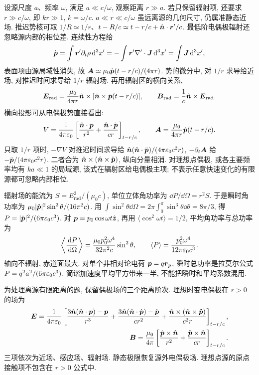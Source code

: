 \label{ch:radiation}
设源尺度 $a$、频率 $\omega$, 满足 $a\ll c/\omega$, 观察距离 $r\gg a$. 若只保留辐射项, 还要求 $r\gg c/\omega$, 即 $kr\gg1$, $k=\omega/c$. $a\ll r\ll c/\omega$ 虽远离源的几何尺寸, 仍属准静态近场. 推迟势核可取 $1/R\simeq1/r$、$t-R/c\simeq t-r/c+\hat{\boldsymbol{n}}\cdot\boldsymbol{r}'/c$. 最低阶电偶极辐射还忽略源内部的相位差. 连续性方程给
\[
\dot{\boldsymbol{p}}=\int\boldsymbol{r}'\partial_t\rho\,\mathrm d^3x'
=-\int\boldsymbol{r}'\nabla'\cdot\boldsymbol{J}\,\mathrm d^3x'=\int\boldsymbol{J}\,\mathrm d^3x',
\]
表面项由源局域性消失, 故 $\boldsymbol{A}\simeq\mu_0\dot{\boldsymbol{p}}(t-r/c)/(4\pi r)$. 势的微分中, 对 $1/r$ 求导给近场, 对推迟时间求导给 $1/r$ 辐射场. 再用辐射区的横向关系,
\[
\boldsymbol{E}_\mathrm{rad}=\frac{\mu_0}{4\pi r}\hat{\boldsymbol{n}}\times[\hat{\boldsymbol{n}}\times\ddot{\boldsymbol{p}}(t-r/c)],\qquad
\boldsymbol{B}_\mathrm{rad}=\frac1c\hat{\boldsymbol{n}}\times\boldsymbol{E}_\mathrm{rad}.
\]
横向投影可从电偶极势直接看出:
\[
V={1\over4\pi\varepsilon_0}\left[\frac{\hat{\boldsymbol{n}}\cdot\boldsymbol{p}}{r^2}+\frac{\hat{\boldsymbol{n}}\cdot\dot{\boldsymbol{p}}}{cr}\right]_{t-r/c},\qquad
\boldsymbol{A}={\mu_0\over4\pi r}\dot{\boldsymbol{p}}(t-r/c).
\]
只取 $1/r$ 项时, $-\nabla V$ 对推迟时间求导给 $\hat{\boldsymbol{n}}(\hat{\boldsymbol{n}}\cdot\ddot{\boldsymbol{p}})/(4\pi\varepsilon_0 c^2r)$, $-\partial_t\boldsymbol{A}$ 给 $-\ddot{\boldsymbol{p}}/(4\pi\varepsilon_0 c^2r)$. 二者合为 $\hat{\boldsymbol{n}}\times(\hat{\boldsymbol{n}}\times\ddot{\boldsymbol{p}})$, 纵向分量相消. 对理想点偶极, 或各主要频率均有 $ka\ll1$ 的局域源, 该式在辐射区给电偶极主项; 不表示任意快速变化的有限源都可忽略内部相位.

辐射场的能流为 $S=E_\mathrm{rad}^2/(\mu_0c)$, 单位立体角功率为 $\dd P/\dd\Omega=r^2S$. 于是瞬时角功率为 $\mu_0|\ddot{\boldsymbol{p}}|^2\sin^2\theta/(16\pi^2c)$. 用
$\int\sin^2\theta\dd\Omega=2\pi\int_0^\pi\sin^3\theta\dd\theta=8\pi/3$, 得 $P=|\ddot{\boldsymbol{p}}|^2/(6\pi\varepsilon_0 c^3)$. 对 $\boldsymbol{p}=p_0\cos\omega t\hat{\boldsymbol{z}}$, 再用 $\langle\cos^2\omega t\rangle=1/2$, 平均角功率与总功率为
\[
\left\langle\frac{\,\mathrm d P}{\,\mathrm d\Omega}\right\rangle
=\frac{\mu_0p_0^2\omega^4}{32\pi^2c}\sin^2\theta,\qquad
\langle P\rangle=\frac{p_0^2\omega^4}{12\pi\varepsilon_0 c^3}.
\]
轴向不辐射, 赤道面最大. 对单个非相对论电荷 $\boldsymbol{p}=q\boldsymbol{r}_p$, 瞬时总功率是拉莫尔公式 $P=q^2a^2/(6\pi\varepsilon_0 c^3)$. 简谐加速度平均平方带来一半, 不能把瞬时和平均系数混用.

为处理离源有限距离的题, 保留偶极场的三个距离阶次. 理想时变电偶极在 $r>0$ 的场为
\begin{align*}
\boldsymbol{E}={1\over4\pi\varepsilon_0}\left[
\frac{3\hat{\boldsymbol{n}}(\hat{\boldsymbol{n}}\cdot\boldsymbol{p})-\boldsymbol{p}}{r^3}
+\frac{3\hat{\boldsymbol{n}}(\hat{\boldsymbol{n}}\cdot\dot{\boldsymbol{p}})-\dot{\boldsymbol{p}}}{cr^2}
+\frac{\hat{\boldsymbol{n}}\times(\hat{\boldsymbol{n}}\times\ddot{\boldsymbol{p}})}{c^2r}\right]_{t-r/c},\\
\boldsymbol{B}={\mu_0\over4\pi}\left[\frac{\dot{\boldsymbol{p}}\times\hat{\boldsymbol{n}}}{r^2}
+\frac{\ddot{\boldsymbol{p}}\times\hat{\boldsymbol{n}}}{cr}\right]_{t-r/c}.
\end{align*}
三项依次为近场、感应场、辐射场. 静态极限恢复源外电偶极场. 理想点源的原点接触项不包含在 $r>0$ 公式中.

